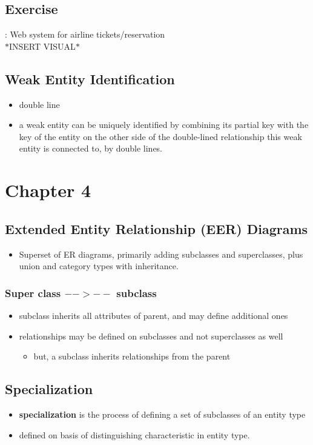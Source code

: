 \documentclass[12pt]{report}
\begin{document}
	\section{Exercise}: Web system for airline tickets/reservation\\
	$\ast$INSERT VISUAL$\ast$
	\section{Weak Entity Identification}
	\begin{itemize}
		\item double line
		\item a weak entity can be uniquely identified by combining its partial key with the key of the entity on the other side of the double-lined relationship this weak entity is connected to, by double lines.
	\end{itemize}
	\chapter{Chapter 4}
	\section{Extended Entity Relationship (EER) Diagrams}
	\begin{itemize}
		\item Superset of ER diagrams, primarily adding subclasses and superclasses, plus union and category types with inheritance.
	\end{itemize}
	\subsection{Super class $-->--$ subclass}
	\begin{itemize}
		\item subclass inherits all attributes of parent, and may define additional ones
		\item relationships may be defined on subclasses and not superclasses as well
		\begin{itemize}
			\item but, a subclass inherits relationships from the parent
		\end{itemize}
	\end{itemize}
	\section{Specialization}
	\begin{itemize}
		\item \textbf{specialization} is the process of defining a set of subclasses of an entity type
		\item defined on basis of distinguishing characteristic in entity type.
	\end{itemize}
\end{document}
